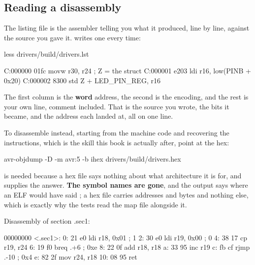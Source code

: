 \subsection{Reading a disassembly}
\label{c1:sec:disasm}
The listing file is the assembler telling you what it produced, line by line, against the source
you gave it.  writes one every time:

\begin{shell}
less drivers/build/drivers.lst
\end{shell}

\begin{console}
C:000000 01fc          movw r30, r24            ; Z = the struct
C:000001 e203          ldi  r16, low(PINB + 0x20)
C:000002 8300          std  Z + LED_PIN_REG, r16
\end{console}

The first column is the \textbf{word} address, the second is the encoding, and the rest is your
own line, comment included. That is the source you wrote, the bits it became, and the address
each landed at, all on one line.

To disassemble instead, starting from the machine code and recovering the instructions, which is
the skill this book is actually after, point  at the hex:

\begin{shell}
avr-objdump -D -m avr:5 -b ihex drivers/build/drivers.hex
\end{shell}

 is needed because a hex file says nothing about what architecture it is for, and
 supplies the answer. \textbf{The symbol names are gone}, and the output says
 where an ELF would have said ; a hex file carries addresses and
bytes and nothing else, which is exactly why the tests read the map file alongside it.

\begin{console}
Disassembly of section .sec1:

00000000 <.sec1>:
   0:   21 e0           ldi     r18, 0x01       ; 1
   2:   30 e0           ldi     r19, 0x00       ; 0
   4:   38 17           cp      r19, r24
   6:   19 f0           breq    .+6             ; 0xe
   8:   22 0f           add     r18, r18
   a:   33 95           inc     r19
   c:   fb cf           rjmp    .-10            ; 0x4
   e:   82 2f           mov     r24, r18
  10:   08 95           ret
\end{console}

